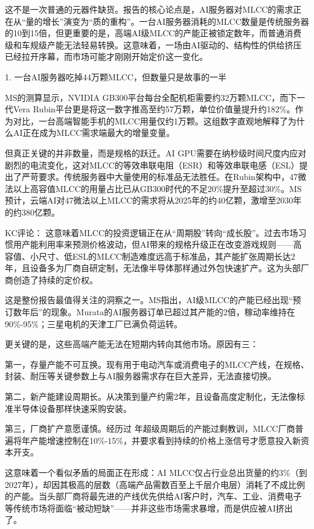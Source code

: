 \documentclass[11pt]{ctexart}
\begin{document}
这不是一次普通的元器件缺货。报告的核心论点是，AI服务器对MLCC的需求正在从“量的增长”演变为“质的重构”。一台AI服务器消耗的MLCC数量是传统服务器的10到15倍，但更重要的是，高端AI级MLCC的产能正被锁定数年，而普通消费级和车规级产能无法轻易转换。这意味着，一场由AI驱动的、结构性的供给挤压已经拉开序幕，而市场可能才刚刚开始定价这一变化。

1. 一台AI服务器吃掉44万颗MLCC，但数量只是故事的一半

MS的测算显示，NVIDIA GB300平台每台全配机柜需要约32万颗MLCC，而下一代Vera Rubin平台更是将这一数字推高至约57万颗，单位价值量提升约182\%。作为对比，一台高端智能手机的MLCC用量仅约1万颗。这组数字直观地解释了为什么AI正在成为MLCC需求端最大的增量变量。

但真正关键的并非数量，而是规格的跃迁。AI GPU需要在纳秒级时间尺度内应对剧烈的电流变化，这对MLCC的等效串联电阻（ESR）和等效串联电感（ESL）提出了严苛要求。传统服务器中大量使用的标准品无法胜任。在Rubin架构中，47微法以上高容值MLCC的用量占比已从GB300时代的不足20\%提升至超过30\%。MS预计，云端AI对47微法以上MLCC的需求将从2025年的约40亿颗，激增至2030年的约380亿颗。

KC评论： 这意味着MLCC的投资逻辑正在从“周期股”转向“成长股”。过去市场习惯用产能利用率来预测价格波动，但AI带来的规格升级正在改变游戏规则——高容值、小尺寸、低ESL的MLCC制造难度远高于标准品，其产能扩张周期长达2年，且设备多为厂商自研定制，无法像半导体那样通过外包快速扩产。这为头部厂商创造了持续的定价权。

这是整份报告最值得关注的洞察之一。MS指出，AI级MLCC的产能已经出现“预订数年后”的现象。Murata的AI服务器订单已超过其产能的2倍，稼动率维持在90\%-95\%；三星电机的天津工厂已满负荷运转。

更关键的是，这些高端产能无法在短期内转向其他市场。原因有三：

第一，存量产能不可互换。现有用于电动汽车或消费电子的MLCC产线，在规格、封装、耐压等关键参数上与AI服务器需求存在巨大差异，无法直接切换。

第二，新产能建设周期长。从决策到量产约需2年，且设备高度定制化，无法像标准半导体设备那样快速采购安装。

第三，厂商扩产意愿谨慎。经历过 年超级周期后的产能过剩教训，MLCC厂商普遍将年产能增速控制在10\%-15\%，并要求看到持续的价格上涨信号才愿意投入新资本开支。

这意味着一个看似矛盾的局面正在形成：AI MLCC仅占行业总出货量的约3\%（到2027年），却因其极高的层数（高端产品需数百至上千层介电层）消耗了不成比例的产能。当头部厂商将最先进的产线优先供给AI客户时，汽车、工业、消费电子等传统市场将面临“被动短缺”——并非这些市场需求暴增，而是供应被AI挤出了。
\end{document}
